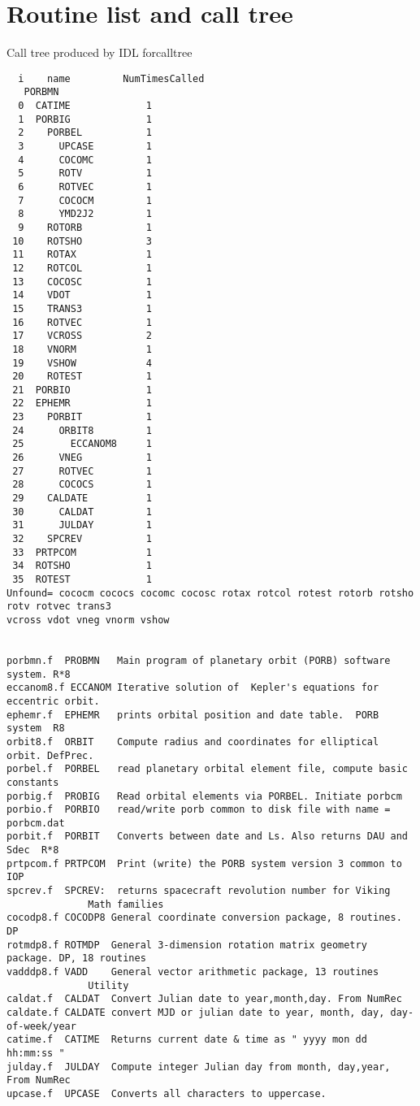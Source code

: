 \documentclass{article}
\begin{document}
\section{Routine list and call tree} %
Call tree produced by IDL forcalltree
\vspace{-3.mm}
\begin{verbatim}
  i    name         NumTimesCalled 
   PORBMN
  0  CATIME             1
  1  PORBIG             1
  2    PORBEL           1
  3      UPCASE         1
  4      COCOMC         1
  5      ROTV           1
  6      ROTVEC         1
  7      COCOCM         1
  8      YMD2J2         1
  9    ROTORB           1
 10    ROTSHO           3
 11    ROTAX            1
 12    ROTCOL           1
 13    COCOSC           1
 14    VDOT             1
 15    TRANS3           1
 16    ROTVEC           1
 17    VCROSS           2
 18    VNORM            1
 19    VSHOW            4
 20    ROTEST           1
 21  PORBIO             1
 22  EPHEMR             1
 23    PORBIT           1
 24      ORBIT8         1
 25        ECCANOM8     1
 26      VNEG           1
 27      ROTVEC         1
 28      COCOCS         1
 29    CALDATE          1
 30      CALDAT         1
 31      JULDAY         1
 32    SPCREV           1
 33  PRTPCOM            1
 34  ROTSHO             1
 35  ROTEST             1
Unfound= cococm cococs cocomc cocosc rotax rotcol rotest rotorb rotsho rotv rotvec trans3 
vcross vdot vneg vnorm vshow


porbmn.f  PROBMN   Main program of planetary orbit (PORB) software system. R*8
eccanom8.f ECCANOM Iterative solution of  Kepler's equations for eccentric orbit.
ephemr.f  EPHEMR   prints orbital position and date table.  PORB system  R8
orbit8.f  ORBIT    Compute radius and coordinates for elliptical orbit. DefPrec.
porbel.f  PORBEL   read planetary orbital element file, compute basic constants
porbig.f  PROBIG   Read orbital elements via PORBEL. Initiate porbcm
porbio.f  PORBIO   read/write porb common to disk file with name = porbcm.dat
porbit.f  PORBIT   Converts between date and Ls. Also returns DAU and Sdec  R*8
prtpcom.f PRTPCOM  Print (write) the PORB system version 3 common to IOP
spcrev.f  SPCREV:  returns spacecraft revolution number for Viking
              Math families
cocodp8.f COCODP8 General coordinate conversion package, 8 routines. DP
rotmdp8.f ROTMDP  General 3-dimension rotation matrix geometry package. DP, 18 routines
vadddp8.f VADD    General vector arithmetic package, 13 routines 
              Utility
caldat.f  CALDAT  Convert Julian date to year,month,day. From NumRec
caldate.f CALDATE convert MJD or julian date to year, month, day, day-of-week/year
catime.f  CATIME  Returns current date & time as " yyyy mon dd hh:mm:ss "
julday.f  JULDAY  Compute integer Julian day from month, day,year, From NumRec
upcase.f  UPCASE  Converts all characters to uppercase.
\end{verbatim}
\end{document}

